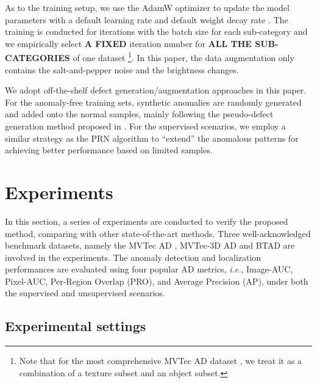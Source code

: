 \documentclass[lettersize,journal]{IEEEtran}
\begin{document}
As to the training setup, we use the AdamW optimizer \cite{loshchilov2018decoupled} to
update the model parameters with a default learning rate  and default
weight decay rate . The training is conducted for  iterations
with the batch size  for each sub-category and we empirically select \textbf{A FIXED}
iteration number for \textbf{ALL THE SUB-CATEGORIES} of one dataset \footnote{Note that
  for the most comprehensive MVTec AD dataset \cite{Bergmann_2019_CVPR}, we treat it as a
  combination of a texture subset and an object subset.}. In this paper, the data augmentation only contains
the salt-and-pepper noise and the brightness changes.

We adopt off-the-shelf defect generation/augmentation approaches in this paper. For the
anomaly-free training sets, synthetic anomalies are randomly generated and added onto the
normal samples, mainly following the pseudo-defect generation method proposed in
\cite{yang2023memseg}. For the supervised scenarios, we employ a similar strategy as the
PRN algorithm \cite{zhang2022prototypical} to ``extend'' the anomalous patterns for
achieving better performance based on limited samples.


\section{Experiments}
\label{sec:experiments}
In this section, a series of experiments are conducted to verify the proposed method,
comparing with other state-of-the-art methods. Three well-acknowledged benchmark datasets, namely the MVTec AD \cite{bergmann2019mvtec}, MVTec-3D AD \cite{Bergmann_2022} and BTAD
\cite{mishra2021vt} are involved in the experiments. The anomaly detection and
localization performances are evaluated using four popular AD metrics, \emph{i.e.},
Image-AUC, Pixel-AUC, Per-Region Overlap (PRO), and Average Precision (AP), under both the
supervised and unsupervised scenarios.

\subsection{Experimental settings}
\label{subsec:exp_setting}
\end{document}
